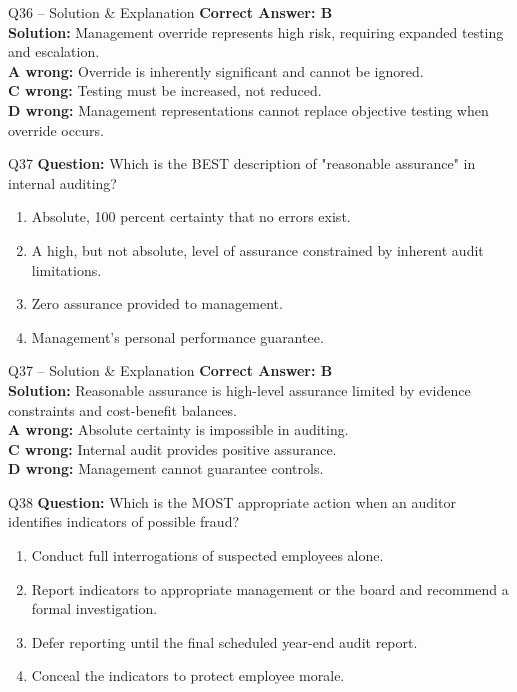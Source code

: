 \documentclass[aspectratio=169,10pt]{beamer}
\begin{document}
	\begin{frame}[t]{Q36 -- Solution \& Explanation}
		\small
		\textbf{Correct Answer: B} \\[4pt]
		\textbf{Solution:} Management override represents high risk, requiring expanded testing and escalation. \\[4pt]
		\textbf{A wrong:} Override is inherently significant and cannot be ignored. \\[2pt]
		\textbf{C wrong:} Testing must be increased, not reduced. \\[2pt]
		\textbf{D wrong:} Management representations cannot replace objective testing when override occurs.
	\end{frame}
	
	\begin{frame}[t]{Q37}
		\small
		\textbf{Question:} Which is the BEST description of "reasonable assurance" in internal auditing?
		\begin{enumerate}[label=\Alph*.,itemsep=1pt,topsep=2pt]
			\item Absolute, 100 percent certainty that no errors exist.
			\item A high, but not absolute, level of assurance constrained by inherent audit limitations.
			\item Zero assurance provided to management.
			\item Management's personal performance guarantee.
		\end{enumerate}
	\end{frame}
	
	\begin{frame}[t]{Q37 -- Solution \& Explanation}
		\small
		\textbf{Correct Answer: B} \\[4pt]
		\textbf{Solution:} Reasonable assurance is high-level assurance limited by evidence constraints and cost-benefit balances. \\[4pt]
		\textbf{A wrong:} Absolute certainty is impossible in auditing. \\[2pt]
		\textbf{C wrong:} Internal audit provides positive assurance. \\[2pt]
		\textbf{D wrong:} Management cannot guarantee controls.
	\end{frame}
	
	\begin{frame}[t]{Q38}
		\small
		\textbf{Question:} Which is the MOST appropriate action when an auditor identifies indicators of possible fraud?
		\begin{enumerate}[label=\Alph*.,itemsep=1pt,topsep=2pt]
			\item Conduct full interrogations of suspected employees alone.
			\item Report indicators to appropriate management or the board and recommend a formal investigation.
			\item Defer reporting until the final scheduled year-end audit report.
			\item Conceal the indicators to protect employee morale.
		\end{enumerate}
	\end{frame}
	
\end{document}
